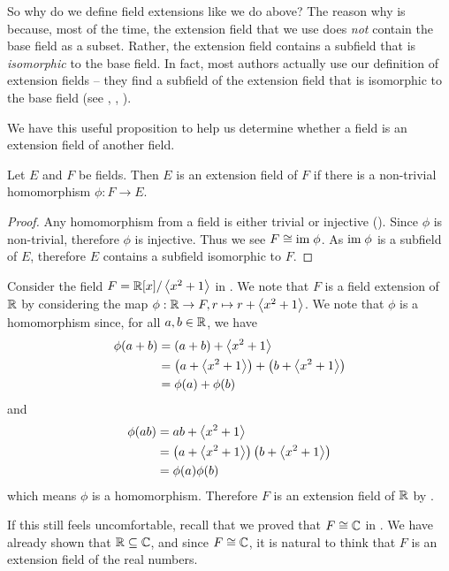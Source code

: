 So why do we define field extensions like we do above? The reason why is because, most of the time, the extension field that we use does \textit{not} contain the base field as a subset. Rather, the extension field contains a subfield that is \textit{isomorphic} to the base field. In fact, most authors actually use our definition of extension fields -- they find a subfield of the extension field that is isomorphic to the base field (see \cite[Theorem 13.1.3]{dummit_foote_2004}, \cite[p.~339, Proof]{gallian_2016}, \cite[Example 21.2]{judson_beezer_2022}).

We have this useful proposition to help us determine whether a field is an extension field of another field.

\begin{proposition}\label{prop-extension-field-if-homomorphism-between-fields}
    Let $E$ and $F$ be fields. Then $E$ is an extension field of $F$ if there is a non-trivial homomorphism $\phi: F \to E$.
\end{proposition}
\begin{proof}
    Any homomorphism from a field is either trivial or injective (). Since $\phi$ is non-trivial, therefore $\phi$ is injective. Thus we see $F \cong \mathrm{im}\;\phi$. As $\mathrm{im}\;\phi$ is a subfield of $E$, therefore $E$ contains a subfield isomorphic to $F$.
\end{proof}

\begin{example}
    Consider the field $F = \mathbb{R}[x]/\left\langle x^2+1\right\rangle$ in . We note that $F$ is a field extension of $\mathbb{R}$ by considering the map $\phi: \mathbb{R} \to F, r \mapsto r + \left\langle x^2+1\right\rangle$. We note that $\phi$ is a homomorphism since, for all $a, b \in \mathbb{R}$, we have
    \begin{align*}
        \phi(a + b) &= (a + b) + \left\langle x^2+1\right\rangle\\
        &= \left(a + \left\langle x^2+1\right\rangle\right) + \left(b + \left\langle x^2+1\right\rangle\right)\\
        &= \phi(a) + \phi(b)
    \end{align*}
    and
    \begin{align*}
        \phi(ab) &= ab + \left\langle x^2+1\right\rangle\\
        &= \left(a + \left\langle x^2+1\right\rangle\right)\left(b + \left\langle x^2+1\right\rangle\right)\\
        &= \phi(a)\phi(b)
    \end{align*}
    which means $\phi$ is a homomorphism. Therefore $F$ is an extension field of $\mathbb{R}$ by .

    If this still feels uncomfortable, recall that we proved that $F \cong \mathbb{C}$ in . We have already shown that $\mathbb{R} \subseteq \mathbb{C}$, and since $F \cong \mathbb{C}$, it is natural to think that $F$ is an extension field of the real numbers.
\end{example}

